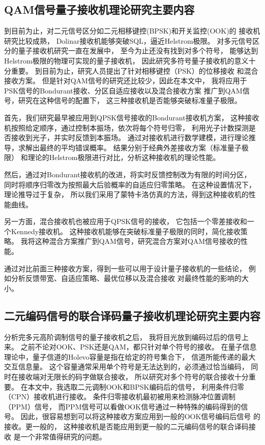 \subsection{QAM信号量子接收机理论研究主要内容}
到目前为止，对二元信号区分如二元相移键控(BPSK)和开关监控(OOK)的
接收机研究比较成熟\cite{helstrom1976quantum,kennedy1973near,dolinar1973optimum,cook2007optical}，
Dolinar接收机能够突破SQL，逼近Helstrom极限\cite{dolinar1973optimum}。
对多元信号区分的量子接收机研究一直在发展中，
至今为止还没有找到对多个符号，
能够达到Helstrom极限的物理可实现的量子接收机，
因此研究多符号量子接收机的意义十分重要。
到目前为止，研究人员提出了针对相移键控（PSK）的位移接收\cite{bondurant1993near,becerra2011m,izumi2012displacement}
和混合接收方案\cite{muller2012quadrature}。
但是针对QAM信号的研究还比较少，因此在本文中，
我将应用于PSK信号的Bondurant接收、分区自适应接收以及混合接收方案
推广到QAM信号，研究在这种信号的配置下，
这三种接收机是否能够突破标准量子极限。


首先，我们研究最早被应用到QPSK信号接收的Bondurant接收机方案，
这种接收机按照给定顺序，通过控制本振场，依次将每个符号归零，
利用光子计数探测是否接收到光子，并实时反馈到本振场。
通过对接收机进行数学建模，进行理论推导，求解出最终的平均错误概率。
结果分别于经典外差接收方案（标准量子极限）
和理论的Helstrom极限进行对比，分析这种接收机的理论性能。

然后，通过对Bondurant接收机的改进，将实时反馈控制改为有限的时间分区，
同时将顺序归零改为按照最大后验概率的自适应归零策略。
在这种设置情况下，理论推导过于复杂，
所以我们采用了蒙特卡洛仿真的方法，得到这种接收机的性能曲线。

另一方面，混合接收机也被应用于QPSK信号的接收，
它包括一个零差接收和一个Kennedy接收机。
这种接收机能够在突破标准量子极限的同时，简化接收策略。
我将这种混合方案推广到QAM信号，研究混合方案对QAM信号接收的性能。

通过对比前面三种接收方案，得到一些可以用于设计量子接收机的一些结论，
例如分析反馈带宽、自适应策略、最优位移以及混合接收
对最终性能的影响的大小。

\subsection{二元编码信号的联合译码量子接收机理论研究主要内容}

分析完多元高阶调制信号的量子接收机之后，
我将目光放到编码过后的信号上来。
之前不论对OOK、PSK还是QAM，都只针对单个符号的接收。
在量子信息理论中，量子信道的Holevo容量是指在给定的符号集合下，
信道所能传递的最大交互信息量。
这个容量通常采用单个符号是无法达到的，必须通过恰当编码，
同时在接收端对无限长的码字做联合接收，
所以研究对多个符号的联合接收十分重要\cite{holevo1996capacity,hausladen1996classical}。
在本文中，我选取二元调制OOK和BPSK编码后的信号，
利用条件归零（CPN）接收机进行接收。
条件归零接收机最初被用来检测脉冲位置调制（PPM）信号\cite{dolinar1982near}，
而PPM信号可以看做OOK信号通过一种特殊的编码得到的信号。
因此，很容易想到可以将这种接收方案应用到一般的OOK信号编码后信号
的接收。更一般的，
这种接收机是否能应用到更一般的二元编码信号的联合译码接收
是一个非常值得研究的问题。

